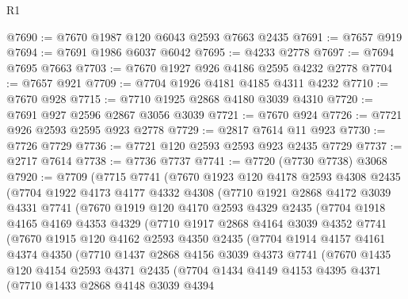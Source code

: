 \begin{lexlean}{R1}
\begin{coremodule}
@7690 := @7670 @1987 @120 @6043 @2593 @7663 @2435
@7691 := @7657 @919
@7694 := @7691 @1986 @6037 @6042
@7695 := @4233 @2778
@7697 := @7694 @7695 @7663
@7703 := @7670 @1927 @926 @4186 @2595 @4232 @2778
@7704 := @7657 @921
@7709 := @7704 @1926 @4181 @4185 @4311 @4232
@7710 := @7670 @928
@7715 := @7710 @1925 @2868 @4180 @3039 @4310
@7720 := @7691 @927 @2596 @2867 @3056 @3039
@7721 := @7670 @924
@7726 := @7721 @926 @2593 @2595 @923 @2778
@7729 := @2817 @7614 @11 @923
@7730 := @7726 @7729
@7736 := @7721 @120 @2593 @2593 @923 @2435 @7729
@7737 := @2717 @7614
@7738 := @7736 @7737
@7741 := @7720 (@7730 @7738) @3068
@7920 := @7709
    (@7715
      @7741
      (@7670
        @1923
        @120
        @4178
        @2593
        @4308
        @2435
        (@7704
          @1922
          @4173
          @4177
          @4332
          @4308
          (@7710
            @1921
            @2868
            @4172
            @3039
            @4331
            @7741
            (@7670
              @1919
              @120
              @4170
              @2593
              @4329
              @2435
              (@7704
                @1918
                @4165
                @4169
                @4353
                @4329
                (@7710
                  @1917
                  @2868
                  @4164
                  @3039
                  @4352
                  @7741
                  (@7670
                    @1915
                    @120
                    @4162
                    @2593
                    @4350
                    @2435
                    (@7704
                      @1914
                      @4157
                      @4161
                      @4374
                      @4350
                      (@7710
                        @1437
                        @2868
                        @4156
                        @3039
                        @4373
                        @7741
                        (@7670
                          @1435
                          @120
                          @4154
                          @2593
                          @4371
                          @2435
                          (@7704
                            @1434
                            @4149
                            @4153
                            @4395
                            @4371
                            (@7710
                              @1433
                              @2868
                              @4148
                              @3039
                              @4394

\end{coremodule}
\end{lexlean}
